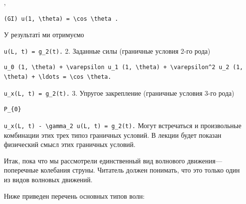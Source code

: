 \documentclass[
  ukrainian,
]{article}
\begin{document}
,

\begin{verbatim}
(GI) u(1, \theta) = \cos \theta .
\end{verbatim}

У результаті ми отримуємо

\texttt{u(L,\ t)\ =\ g\_2(t).} 2. Заданные силы (граничные условия 2-го
рода)

\begin{verbatim}
u_0 (1, \theta) + \varepsilon u_1 (1, \theta) + \varepsilon^2 u_2 (1, \theta) + \ldots = \cos \theta.
\end{verbatim}

\texttt{u\_x(L,\ t)\ =\ g\_2(t).} 3. Упругое закрепление (граничные
условия 3-го рода)

\begin{verbatim}
P_{0}
\end{verbatim}

\texttt{u\_x(L,\ t)\ -\ \textbackslash{}gamma\_2\ u(L,\ t)\ =\ g\_2(t).}
Могут встречаться и произвольные комбинации этих трех типоз граничных
условий. В лекции будет показан физический смысл этих граничных условий.

Итак, пока что мы рассмотрели единственный вид волнового
движения---поперечные колебания струны. Читатель должен понимать, что
это только один из видов волновых движений.

Ниже приведен перечень основных типов волн:
\end{document}
